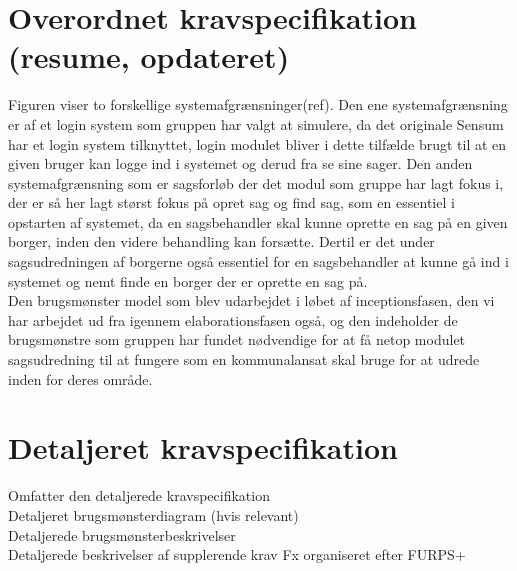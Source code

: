 \section{Overordnet kravspecifikation (resume, opdateret)}
Figuren viser to forskellige systemafgrænsninger(ref). Den ene systemafgrænsning er af et login system som gruppen har valgt at simulere, da det originale Sensum har et login system tilknyttet, login modulet bliver i dette tilfælde brugt til at en given bruger kan logge ind i systemet og derud fra se sine sager. Den anden systemafgrænsning som er sagsforløb der det modul som gruppe har lagt fokus i, der er så her lagt størst fokus på opret sag og find sag, som en essentiel i opstarten af systemet, da en sagsbehandler skal kunne oprette en sag på en given borger, inden den videre behandling kan forsætte. Dertil er det under sagsudredningen af borgerne også essentiel for en sagsbehandler at kunne gå ind i systemet og nemt finde en borger der er oprette en sag på.\\
Den brugsmønster model som blev udarbejdet i løbet af inceptionsfasen, den vi har arbejdet ud fra igennem elaborationsfasen også, og den indeholder de brugsmønstre som gruppen har fundet nødvendige for at få netop modulet sagsudredning til at fungere som en kommunalansat skal bruge for at udrede inden for deres område. 

\section{Detaljeret kravspecifikation}
Omfatter den detaljerede kravspecifikation\\
Detaljeret brugsmønsterdiagram (hvis relevant)\\
Detaljerede brugsmønsterbeskrivelser\\
Detaljerede beskrivelser af supplerende krav Fx organiseret efter FURPS+\\




